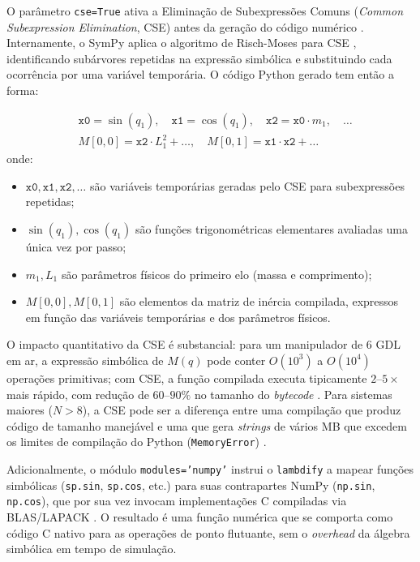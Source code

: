 O parâmetro \texttt{cse=True} ativa a Eliminação de Subexpressões Comuns (\textit{Common Subexpression Elimination}, CSE) antes da geração do código numérico \cite{alfred2007compilers}. Internamente, o SymPy aplica o algoritmo de Risch-Moses para CSE \cite{moses1971algebraic}, identificando subárvores repetidas na expressão simbólica e substituindo cada ocorrência por uma variável temporária. O código Python gerado tem então a forma:

\begin{align}
    &\texttt{x0} = \sin(q_1), \quad \texttt{x1} = \cos(q_1), \quad \texttt{x2} = \texttt{x0} \cdot m_1, \quad \ldots \nonumber \\
    &M[0,0] = \texttt{x2} \cdot L_1^2 + \ldots, \quad M[0,1] = \texttt{x1} \cdot \texttt{x2} + \ldots
    \label{eq:cse_example}
\end{align}
onde:
\begin{itemize}
    \item $\texttt{x0}, \texttt{x1}, \texttt{x2}, \ldots$ são variáveis temporárias geradas pelo CSE para subexpressões repetidas;
    \item $\sin(q_1), \cos(q_1)$ são funções trigonométricas elementares avaliadas uma única vez por passo;
    \item $m_1, L_1$ são parâmetros físicos do primeiro elo (massa e comprimento);
    \item $M[0,0], M[0,1]$ são elementos da matriz de inércia compilada, expressos em função das variáveis temporárias e dos parâmetros físicos.
\end{itemize}

O impacto quantitativo da CSE é substancial: para um manipulador de 6 GDL em ar, a expressão simbólica de $M(q)$ pode conter $O(10^3)$ a $O(10^4)$ operações primitivas; com CSE, a função compilada executa tipicamente $2$--$5\times$ mais rápido, com redução de $60$--$90\%$ no tamanho do \textit{bytecode} \cite{meurer2017sympy, alfred2007compilers}. Para sistemas maiores ($N > 8$), a CSE pode ser a diferença entre uma compilação que produz código de tamanho manejável e uma que gera \textit{strings} de vários MB que excedem os limites de compilação do Python (\texttt{MemoryError}) \cite{leu1986automated}.

Adicionalmente, o módulo \texttt{modules='numpy'} instrui o \texttt{lambdify} a mapear funções simbólicas (\texttt{sp.sin}, \texttt{sp.cos}, etc.) para suas contrapartes NumPy (\texttt{np.sin}, \texttt{np.cos}), que por sua vez invocam implementações C compiladas via BLAS/LAPACK \cite{meurer2017sympy}. O resultado é uma função numérica que se comporta como código C nativo para as operações de ponto flutuante, sem o \textit{overhead} da álgebra simbólica em tempo de simulação.

